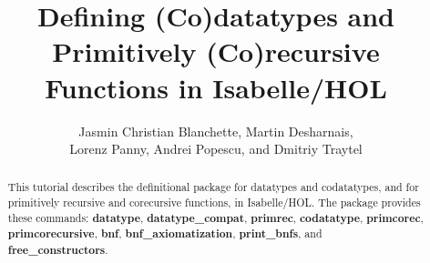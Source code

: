 \documentclass[12pt,a4paper]{article} %
\title{%
Defining (Co)datatypes and Primitively (Co)recursive Functions in Isabelle/HOL}
\author{Jasmin Christian Blanchette,
Martin Desharnais, \\
Lorenz Panny,
Andrei Popescu, and
Dmitriy Traytel}
\renewcommand\_{\hbox{\textunderscore\kern-.05ex}}
\newcommand{\keyw}[1]{\textbf{#1}}
\begin{document}
\maketitle

\begin{sloppy}
\begin{abstract}
\noindent
This tutorial describes the definitional package for datatypes and codatatypes,
and for primitively recursive and corecursive functions, in Isabelle/HOL. The
package provides these commands:
\keyw{datatype}, \keyw{datatype_compat}, \keyw{primrec}, \keyw{codatatype},
\keyw{primcorec}, \keyw{prim\-co\-recursive}, \keyw{bnf}, \keyw{bnf_axiomatization},
\keyw{print_bnfs}, and \keyw{free_\allowbreak constructors}.
\end{abstract}
\end{sloppy}

\tableofcontents



\let\em=\sl
{}

\end{document}

